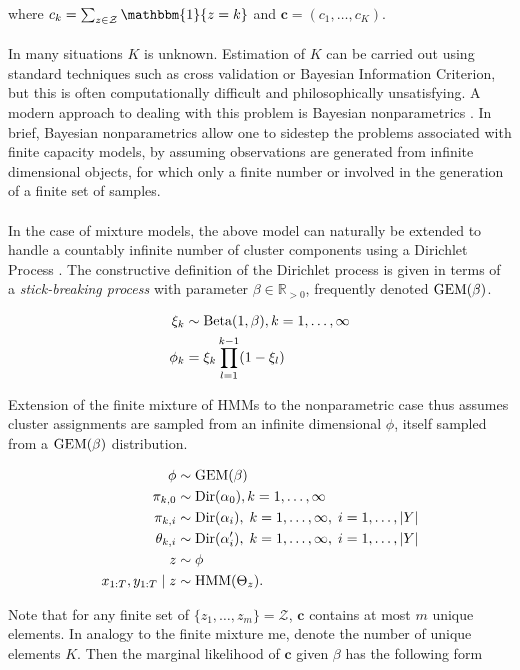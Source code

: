 \documentclass[12pt]{report}
\newcommand{\p}[0]{\prime}
\newcommand{\1}[0]{\mathbbm{1}}
\newcommand{\Beta}[0]{\textnormal{Beta}}
\newcommand{\Dir}[0]{\textnormal{Dir}}
\newcommand{\GEM}[0]{\textnormal{GEM}}
\newcommand{\HMM}[0]{\textnormal{HMM}}
\newcommand{\seq}[3]{\ensuremath{#1_{{#2}:{#3}}}}
\DeclarePairedDelimiter\abs{\lvert}{\rvert}%
\begin{document}
where $c_k = \sum_{z \in \mathcal{Z}}\1\{z = k\}$ and $\bm{c} = (c_1, \ldots, c_K)$.
\\\\
In many situations $K$ is unknown. Estimation of $K$ can be carried out using standard 
techniques such as cross validation or Bayesian Information Criterion, but this is
often computationally difficult and philosophically unsatisfying. A modern 
approach to dealing with this problem is Bayesian nonparametrics \cite{jordan-bayesian-nonparam}. 
In brief, Bayesian nonparametrics allow one to sidestep the problems associated with finite
capacity models, by assuming observations are generated from infinite dimensional objects,
for which only a finite number or involved in the generation of a finite set of samples. 
\\\\
In the case of mixture models, the above model can naturally be extended to handle a 
countably infinite number of cluster components using a Dirichlet Process \cite{teh-dirichlet}.
The constructive definition of the Dirichlet process is given in terms of a 
\emph{stick-breaking process} \cite{sethuraman-constructive} with parameter 
$\beta \in \mathbb{R}_{>0}$, frequently denoted $\GEM(\beta)$.

\begin{align*}
    \xi_k & \sim \Beta(1, \beta), k = 1,\ldots,\infty\\
    \phi_k & = \xi_k \prod_{l=1}^{k-1} (1 - \xi_l)
\end{align*}

Extension of the finite mixture of \acp{HMM} to the nonparametric case thus assumes cluster 
assignments are sampled from an infinite dimensional $\phi$, itself sampled
from a $\GEM(\beta)$ distribution.

\begin{align*}
    \phi & \sim \GEM(\beta) \\
    \pi_{k,0} & \sim \Dir(\alpha_0), k=1,\ldots,\infty \\
    \pi_{k,i} & \sim \Dir(\alpha_i),\; k=1,\ldots,\infty,\; i=1,\ldots,\abs{Y} \\
    \theta_{k,i} & \sim \Dir(\alpha_i^\p),\; k=1,\ldots,\infty,\; i = 1,\ldots,\abs{Y} \\
    z & \sim \phi \\
    \seq{x}{1}{T}, \seq{y}{1}{T} \mid z & \sim \HMM(\Theta_z).
\end{align*}

Note that for any finite set of $\{z_1, \ldots, z_m\} = \mathcal{Z}$, 
$\bm{c}$ contains at most $m$ unique elements. In analogy to the finite 
mixture me, denote the number of unique elements $K$. Then the marginal likelihood 
of $\bm{c}$ given $\beta$ has the following form \cite{kyung-estimation-dirichlet}
\end{document}
